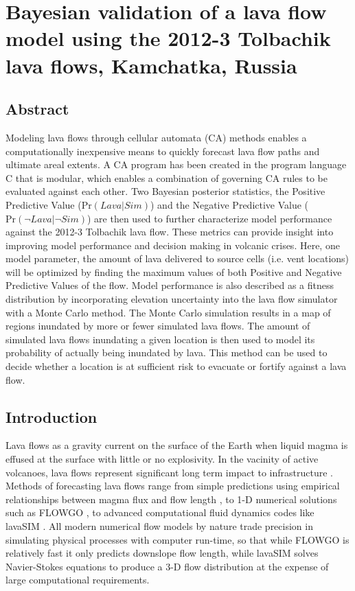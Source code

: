 \chapter{Bayesian validation of a lava flow model using the 2012-3 Tolbachik lava flows, Kamchatka, Russia}\label{ch_molasses}

\renewcommand*{\FigPath}{figures/chapter-molasses}

\section*{Abstract}
	Modeling lava flows through cellular automata (CA) methods enables a computationally inexpensive means to quickly forecast lava flow paths and ultimate areal extents. A CA program has been created in the program language C that is modular, which enables a combination of governing CA rules to be evaluated against each other. Two Bayesian posterior statistics, the Positive Predictive Value ($\text{Pr}(Lava|Sim)$) and the Negative Predictive Value ($\text{Pr}(\neg Lava|\neg Sim)$) are then used to further characterize model performance against the 2012-3 Tolbachik lava flow. These metrics can provide insight into improving model performance and decision making in volcanic crises. Here, one model parameter, the amount of lava delivered to source cells (i.e. vent locations) will be optimized by finding the maximum values of both Positive and Negative Predictive Values of the flow. Model performance is also described as a fitness distribution by incorporating elevation uncertainty into the lava flow simulator with a Monte Carlo method. The Monte Carlo simulation results in a map of regions inundated by more or fewer simulated lava flows. The amount of simulated lava flows inundating a given location is then used to model its probability of actually being inundated by lava. This method can be used to decide whether a location is at sufficient risk to evacuate or fortify against a lava flow.

\section{Introduction}
	Lava flows as a gravity current on the surface of the Earth when liquid magma is effused at the surface with little or no explosivity. In the vacinity of active volcanoes, lava flows represent significant long term impact to infrastructure \citep{peterson2000lava}. Methods of forecasting lava flows range from simple predictions using empirical relationships between magma flux and flow length \citep{Glaze2003}, to 1-D numerical solutions such as FLOWGO \citep{harris2001flowgo}, to advanced computational fluid dynamics codes like lavaSIM \citep{hidaka2005vtfs}. All modern numerical flow models by nature trade precision in simulating physical processes with computer run-time, so that while FLOWGO is relatively fast it only predicts downslope flow length, while lavaSIM solves Navier-Stokes equations to produce a 3-D flow distribution at the expense of large computational requirements.
	
